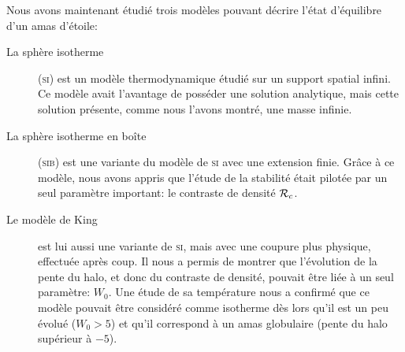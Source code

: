 Nous avons maintenant étudié trois modèles pouvant décrire l'état d'équilibre d'un amas d'étoile:
\begin{description}
	\item[La sphère isotherme] (\textsc{si}) est un modèle thermodynamique étudié sur un support spatial infini. Ce modèle avait l'avantage de posséder une solution analytique,
		mais cette solution présente, comme nous l'avons montré, une masse infinie.
	\item[La sphère isotherme en boîte] (\textsc{sib}) est une variante du modèle de \textsc{si} avec une extension
		finie. Grâce à ce modèle, nous avons appris que l'étude de la stabilité était pilotée par un seul paramètre important:
		le contraste de densité $\mathcal{R}_c$.
	\item[Le modèle de King] est lui aussi une variante de \textsc{si}, mais avec une coupure plus physique, effectuée après coup. Il nous a permis de montrer que l'évolution
		de la pente du halo, et donc du contraste de densité, pouvait être liée à un seul paramètre: $W_0$.
		Une étude de sa température nous a confirmé que ce modèle pouvait être considéré comme isotherme dès lors qu'il est un peu évolué
		($W_0 > 5$) et qu'il correspond à un amas globulaire (pente du halo supérieur à $-5$).
\end{description}

